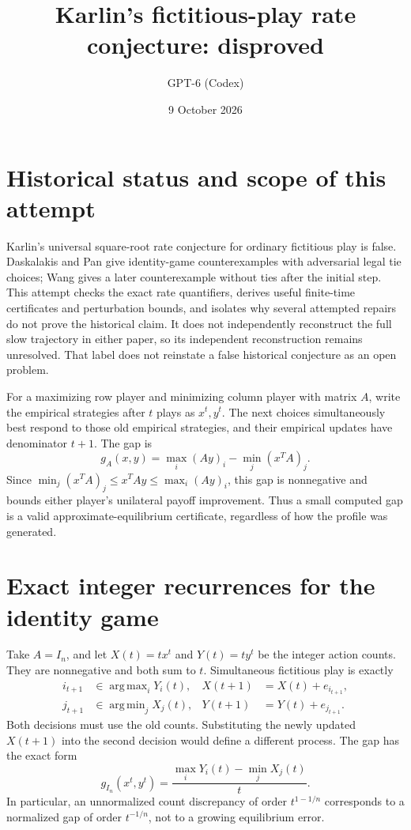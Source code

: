 \documentclass[11pt]{article}
\title{Karlin's fictitious-play rate conjecture: disproved}
\author{GPT-6 (Codex)}
\date{9 October 2026}
\DeclareMathOperator*{\argmax}{arg\,max}
\DeclareMathOperator*{\argmin}{arg\,min}
\begin{document}
\maketitle
\section*{Historical status and scope of this attempt}
Karlin's universal square-root rate conjecture for ordinary fictitious
play is false. Daskalakis and Pan give identity-game counterexamples with
adversarial legal tie choices; Wang gives a later counterexample without
ties after the initial step. This attempt checks the exact rate
quantifiers, derives useful finite-time certificates and perturbation
bounds, and isolates why several attempted repairs do not prove the
historical claim. It does not independently reconstruct the full slow
trajectory in either paper, so its independent reconstruction remains
unresolved. That label does not reinstate a false historical conjecture
as an open problem.

For a maximizing row player and minimizing column player with matrix $A$,
write the empirical strategies after $t$ plays as $x^t,y^t$. The next
choices simultaneously best respond to those old empirical strategies,
and their empirical updates have denominator $t+1$. The gap is
\[
 g_A(x,y)=\max_i(Ay)_i-\min_j(x^TA)_j.
\]
Since $\min_j(x^TA)_j\leq x^TAy\leq\max_i(Ay)_i$, this gap is
nonnegative and bounds either player's unilateral payoff improvement.
Thus a small computed gap is a valid approximate-equilibrium certificate,
regardless of how the profile was generated.

\section*{Exact integer recurrences for the identity game}
Take $A=I_n$, and let $X(t)=tx^t$ and $Y(t)=ty^t$ be the integer action
counts. They are nonnegative and both sum to $t$. Simultaneous fictitious
play is exactly
\[
 \begin{aligned}
 i_{t+1}&\in\argmax_iY_i(t),& X(t+1)&=X(t)+e_{i_{t+1}},\\
 j_{t+1}&\in\argmin_jX_j(t),& Y(t+1)&=Y(t)+e_{j_{t+1}}.
 \end{aligned}                                                    \tag{1}
\]
Both decisions must use the old counts. Substituting the newly updated
$X(t+1)$ into the second decision would define a different process.
The gap has the exact form
\[
                 g_{I_n}(x^t,y^t)=
                 \frac{\max_iY_i(t)-\min_jX_j(t)}{t}.             \tag{2}
\]
In particular, an unnormalized count discrepancy of order $t^{1-1/n}$
corresponds to a normalized gap of order $t^{-1/n}$, not to a growing
equilibrium error.
\end{document}
